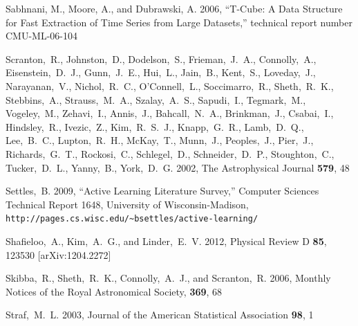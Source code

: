 \documentclass[prd,nofootbib,floatfix,11pt,tightenlines]{revtex4}
\begin{document}
\begin{thebibliography}{99}


Sabhnani, M., Moore, A., and Dubrawski, A. 2006,
``T-Cube: A Data Structure for Fast Extraction of Time Series from Large Datasets,''
technical report number CMU-ML-06-104

Scranton,~R., Johnston,~D., Dodelson,~S., Frieman,~J.~A., Connolly,~A.,
Eisenstein,~D.~J., Gunn,~J.~E., Hui,~L., Jain,~B., Kent,~S., Loveday,~J.,
Narayanan,~V., Nichol,~R.~C., O'Connell,~L., Soccimarro,~R., Sheth,~R.~K.,
Stebbins,~A., Strauss,~M.~A., Szalay,~A.~S., Sapudi,~I., Tegmark,~M.,
Vogeley,~M., Zehavi,~I., Annis,~J., Bahcall,~N.~A., Brinkman,~J., Csabai,~I.,
Hindsley,~R., Ivezic,~Z., Kim,~R.~S.~J., Knapp,~G.~R., Lamb,~D.~Q., Lee,~B.~C.,
Lupton,~R.~H., McKay,~T., Munn,~J., Peoples,~J., Pier,~J., Richards,~G.~T.,
Rockosi,~C., Schlegel,~D., Schneider,~D.~P., Stoughton,~C., Tucker,~D.~L.,
Yanny,~B., York,~D.~G. 2002, The Astrophysical Journal {\bf 579}, 48


Settles,~B. 2009, ``Active Learning Literature Survey,'' Computer Sciences Technical
Report 1648, University of Wisconsin-Madison,
\verb|http://pages.cs.wisc.edu/~bsettles/active-learning/|


Shafieloo,~A., Kim,~A.~G., and Linder,~E.~V. 2012,
Physical Review D {\bf 85}, 123530 [arXiv:1204.2272]


Skibba,~R., Sheth,~R.~K., Connolly,~A.~J., and Scranton,~R. 2006,
Monthly Notices of the Royal Astronomical Society, {\bf 369}, 68

Straf,~M.~L. 2003, Journal of the American Statistical Association {\bf 98}, 1


\end{thebibliography}
\end{document}
